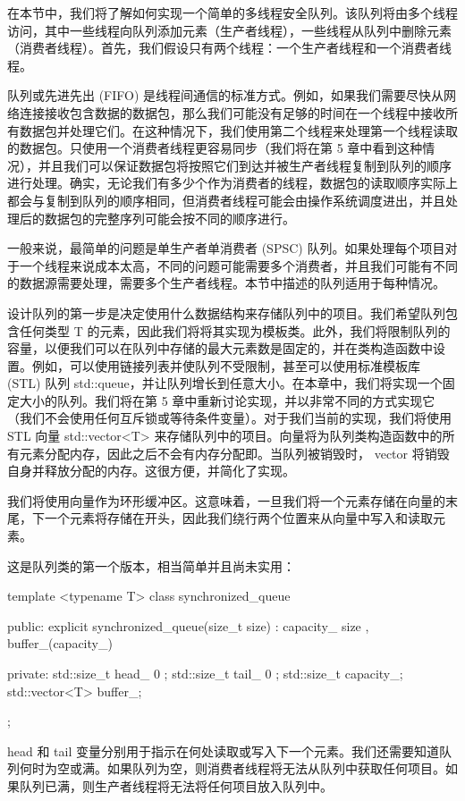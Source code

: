 在本节中，我们将了解如何实现一个简单的多线程安全队列。该队列将由多个线程访问，其中一些线程向队列添加元素（生产者线程），一些线程从队列中删除元素（消费者线程）。首先，我们假设只有两个线程：一个生产者线程和一个消费者线程。

队列或先进先出 (FIFO) 是线程间通信的标准方式。例如，如果我们需要尽快从网络连接接收包含数据的数据包，那么我们可能没有足够的时间在一个线程中接收所有数据包并处理它们。在这种情况下，我们使用第二个线程来处理第一个线程读取的数据包。只使用一个消费者线程更容易同步（我们将在第 5 章中看到这种情况），并且我们可以保证数据包将按照它们到达并被生产者线程复制到队列的顺序进行处理。确实，无论我们有多少个作为消费者的线程，数据包的读取顺序实际上都会与复制到队列的顺序相同，但消费者线程可能会由操作系统调度进出，并且处理后的数据包的完整序列可能会按不同的顺序进行。

一般来说，最简单的问题是单生产者单消费者 (SPSC) 队列。如果处理每个项目对于一个线程来说成本太高，不同的问题可能需要多个消费者，并且我们可能有不同的数据源需要处理，需要多个生产者线程。本节中描述的队列适用于每种情况。

设计队列的第一步是决定使用什么数据结构来存储队列中的项目。我们希望队列包含任何类型 T 的元素，因此我们将将其实现为模板类。此外，我们将限制队列的容量，以便我们可以在队列中存储的最大元素数是固定的，并在类构造函数中设置。例如，可以使用链接列表并使队列不受限制，甚至可以使用标准模板库 (STL) 队列 std::queue，并让队列增长到任意大小。在本章中，我们将实现一个固定大小的队列。我们将在第 5 章中重新讨论实现，并以非常不同的方式实现它（我们不会使用任何互斥锁或等待条件变量）。对于我们当前的实现，我们将使用 STL 向量 std::vector<T> 来存储队列中的项目。向量将为队列类构造函数中的所有元素分配内存，因此之后不会有内存分配即。当队列被销毁时， vector 将销毁自身并释放分配的内存。这很方便，并简化了实现。

我们将使用向量作为环形缓冲区。这意味着，一旦我们将一个元素存储在向量的末尾，下一个元素将存储在开头，因此我们绕行两个位置来从向量中写入和读取元素。

这是队列类的第一个版本，相当简单并且尚未实用：

\begin{cpp}
template <typename T>
class synchronized_queue {
public:
    explicit synchronized_queue(size_t size) :
        capacity_{ size }, buffer_(capacity_)
        {}

private:
    std::size_t head_{ 0 };
    std::size_t tail_{ 0 };
    std::size_t capacity_;
    std::vector<T> buffer_;
};
\end{cpp}

head 和 tail 变量分别用于指示在何处读取或写入下一个元素。我们还需要知道队列何时为空或满。如果队列为空，则消费者线程将无法从队列中获取任何项目。如果队列已满，则生产者线程将无法将任何项目放入队列中。

